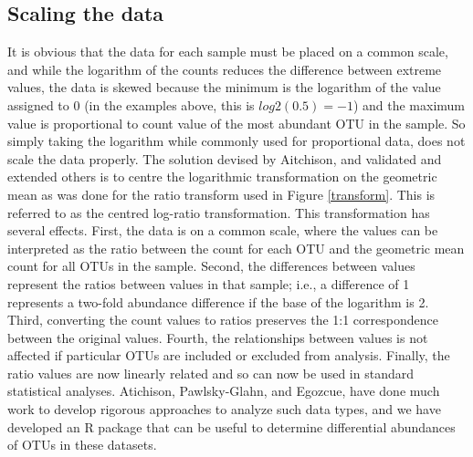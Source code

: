 \documentclass[11pt]{article}\usepackage[]{graphicx}\usepackage[]{color}
\begin{document}
\subsection{Scaling the data}
It is obvious that the data for each sample must be placed on a common scale, and while the logarithm of the counts reduces the difference between extreme values, the data is skewed because the minimum is the logarithm of the value assigned to 0 (in the examples above, this is $log2(0.5)=-1$) and the maximum value is proportional to count value of the most abundant OTU in the sample. So simply taking the logarithm while commonly used for proportional data, does not scale the data properly\cite{Aitchison:1986}. The solution devised by Aitchison, and validated and extended others\cite{pawlowsky2011compositional} is to centre the logarithmic transformation on the geometric mean as was done for the ratio transform used in Figure \ref{transform}. This is referred to as the centred log-ratio transformation. This transformation has several effects. First, the data is on a common scale, where the values can be interpreted as the ratio between the count for each OTU and the geometric mean count for all OTUs in the sample. Second, the differences between values represent the ratios between values in that sample; i.e., a difference of 1 represents a two-fold abundance difference if the base of the logarithm is 2. Third, converting the count values to ratios preserves the 1:1 correspondence between the original values. Fourth, the relationships between values is not affected if particular OTUs are included or excluded from analysis. Finally, the ratio values are now linearly related and so can now be used in standard statistical analyses. Atichison\cite{Aitchison:1986}, Pawlsky-Glahn\cite{Pawlowsky-Glahn:2006}, and Egozcue\cite{egozcue2005}, have done much work to develop rigorous approaches to analyze such data types\cite{pawlowsky2011compositional}, and we have developed an R package that can be useful to determine differential abundances of OTUs in these datasets\cite{fernandes:2013,fernandes:2014}. 
\end{document}
